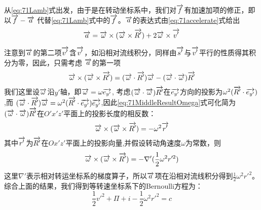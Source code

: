 从\eqref{eq:71Lamb}式出发，由于是在转动坐标系中，我们对$\v{f}$有加速加项的修正，即以$\v{f}-\v{a}$
代替\eqref{eq:71Lamb}式中的$\v{f}$。$\v{a}$的表达式由\eqref{eq:71accelerate}式给出
\begin{equation}\label{eq:71accelerate}
\v{a}=\v{\omega}\times(\v{\omega}\times\v{R'})+2\v{\omega}\times\v{v'}
\end{equation}

注意到$\v{a}$的第二项$\v{v'}$含$\v{v'}$，如沿相对流线积分，同样由$\v{s'}$与$\v{v'}$平行的性质得其积分为零，因此，只需考虑
$\v{a}$的第一项
\begin{equation}\label{eq:71MiddleResultOmega}
\v{\omega}\times(\v{\omega}\times\v{R'}) = (\v{\omega}\cdot \v{R'})\v{\omega}-(\v{\omega}\cdot \v{\omega})\v{R'}
\end{equation}
我们这里设$\v{\omega}$沿$y'$轴，即$\v{\omega}=\omega \v{e_{y'}}$,
考虑$(\v{\omega}\cdot \v{\omega})\v{R'}$在$\v{e_{y'}}$方向的投影为$\omega^2(\v{R'}\cdot \v{e_{y'}})$,而
$(\v{\omega}\cdot \v{R'})\v{\omega}=\omega^2(\v{R'}\cdot \v{e_{y'}})\v{e_{y'}}$,因此\eqref{eq:71MiddleResultOmega}式可化简为
$(\v{\omega}\cdot \v{\omega})\v{R'}$在$O'x'z'$平面上的投影长度的相反数：
\begin{equation}
\v{\omega}\times(\v{\omega}\times\v{R'})=-\omega^2 \v{r'}
\end{equation}
其中$\v{r'}$为$\v{R'}$在$Ox'z'$平面上的投影向量,并假设转动角速度$\omega$为常数，则
\begin{equation}
\v{\omega}\times(\v{\omega}\times\v{R'})=-\nabla' (\frac{1}{2}\omega^2 r'^2)
\end{equation}
这里$\nabla'$表示相对转运坐标系的梯度算子，所以$\v{a}$项在沿相对流线积分得到$\frac{1}{2}\omega^2 r'^2$。
综合上面的结果，我们得到等转速坐标系下的Bernoulli方程为：
\begin{equation}
\frac{1}{2}v'^2+\Pi+i-\frac{1}{2}\omega^2 r'^2 = c
\end{equation}
